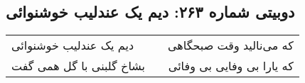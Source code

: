 \begin{center}
\section*{دوبیتی شماره ۲۶۳: دیم یک عندلیب خوشنوائی}
\label{sec:263}
\begin{longtable}{l p{0.5cm} r}
دیم یک عندلیب خوشنوائی
&&
که می‌نالید وقت صبحگاهی
\\
بشاخ گلبنی با گل همی گفت
&&
که یارا بی وفایی بی وفائی
\\
\end{longtable}
\end{center}

